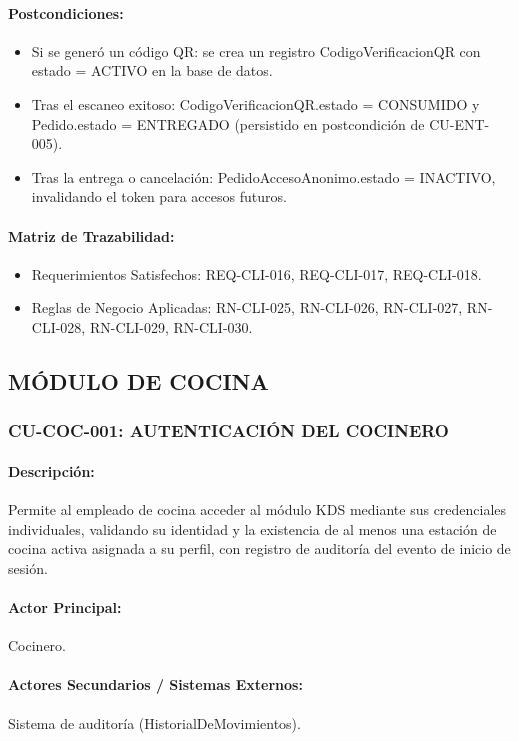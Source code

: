\paragraph{Postcondiciones:}
\begin{itemize}
    \item Si se generó un código QR: se crea un registro CodigoVerificacionQR con estado = ACTIVO en la base de datos.
    \item Tras el escaneo exitoso: CodigoVerificacionQR.estado = CONSUMIDO y Pedido.estado = ENTREGADO (persistido en postcondición de CU-ENT-005).
    \item Tras la entrega o cancelación: PedidoAccesoAnonimo.estado = INACTIVO, invalidando el token para accesos futuros.
\end{itemize}

\paragraph{Matriz de Trazabilidad:}
\begin{itemize}
    \item Requerimientos Satisfechos: REQ-CLI-016, REQ-CLI-017, REQ-CLI-018.
    \item Reglas de Negocio Aplicadas: RN-CLI-025, RN-CLI-026, RN-CLI-027, RN-CLI-028, RN-CLI-029, RN-CLI-030.
\end{itemize}

\subsection{MÓDULO DE COCINA}
\subsubsection{CU-COC-001: AUTENTICACIÓN DEL COCINERO}
\paragraph{Descripción:} Permite al empleado de cocina acceder al módulo KDS mediante sus credenciales individuales, validando su identidad y la existencia de al menos una estación de cocina activa asignada a su perfil, con registro de auditoría del evento de inicio de sesión.

\paragraph{Actor Principal:} Cocinero.

\paragraph{Actores Secundarios / Sistemas Externos:} Sistema de auditoría (HistorialDeMovimientos).

